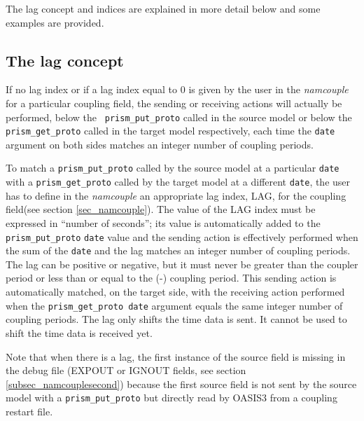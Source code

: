 The lag concept and indices are explained in more detail below and some
examples are provided.

\subsection{The lag concept}
\label{subsub_lag}

If no lag index or if a lag index equal to 0 is given by the user in
the {\it namcouple} for a particular coupling field, the sending or
receiving actions will actually be performed, below the {\tt
  prism\_put\_proto} called in the source model or below the {\tt
  prism\_get\_proto} called in the target model respectively, each time the
{\tt date} argument on both sides matches an integer number of
coupling periods.
 
To match a {\tt prism\_put\_proto} called by the source model at a
particular {\tt date} with a {\tt prism\_get\_proto} called by the target
model at a different {\tt date}, the user has to define in the {\it
namcouple} an appropriate lag index, LAG, for the coupling field(see
section \ref{sec_namcouple}). The value of the LAG index must be
expressed in ``number of seconds''; its value is automatically added
to the {\tt prism\_put\_proto} {\tt date} value and the sending action is
effectively performed when the sum of the {\tt date} and the lag matches an
integer number of coupling periods. The lag can be positive or negative,
but it must never be greater than the coupler period or less than or
equal to the (-) coupling period.  This sending action is
automatically matched, on the target side, with the receiving action
performed when the {\tt prism\_get\_proto date} argument equals the
same integer number of coupling periods.  The lag only shifts the
time data is sent.  It cannot be used to shift the time data is
received yet.

Note that when there is a lag, the first instance of the source field
is missing in the debug file (EXPOUT or IGNOUT fields, see section
\ref{subsec_namcouplesecond}) because the first source field is not
sent by the source model with a {\tt prism\_put\_proto} but directly
read by OASIS3 from a coupling restart file.
 
